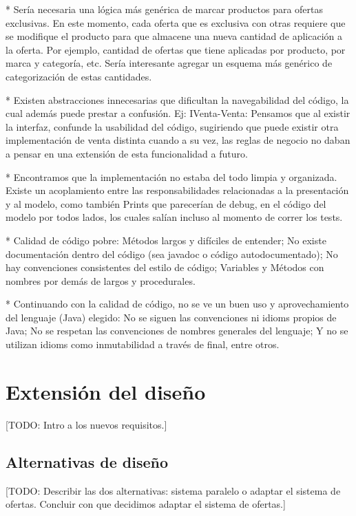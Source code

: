 \documentclass[a4paper,11pt]{article}
\begin{document}
  * Sería necesaria una lógica más genérica de marcar productos para ofertas
  exclusivas. En este momento, cada oferta que es exclusiva con otras
  requiere que se modifique el producto para que almacene una nueva cantidad de
  aplicación a la oferta. Por ejemplo, cantidad de ofertas que tiene aplicadas por producto,
  por marca y categoría, etc. Sería interesante agregar un esquema más genérico de 
  categorización de estas cantidades.

  * Existen abstracciones innecesarias que dificultan la navegabilidad del código, la cual 
  además puede prestar a confusión. Ej: IVenta-Venta: Pensamos que al existir la interfaz, 
  confunde la usabilidad del código, sugiriendo que puede existir otra implementación de venta
  distinta cuando a su vez, las reglas de negocio no daban a pensar en una extensión de esta 
  funcionalidad a futuro.
  
  * Encontramos que la implementación no estaba del todo limpia y organizada. Existe un
  acoplamiento entre las responsabilidades relacionadas a la presentación y al modelo,
  como también Prints que parecerían de debug, en el código del modelo por todos
  lados, los cuales salían incluso al momento de correr los tests.

  * Calidad de código pobre: Métodos largos y difíciles de entender; No existe documentación 
  dentro del código (sea javadoc o código autodocumentado); No hay convenciones consistentes
  del estilo de código; Variables y Métodos con nombres por demás de largos y procedurales.

  * Continuando con la calidad de código, no se ve un buen uso y aprovechamiento del lenguaje 
  (Java) elegido: No se siguen las convenciones ni idioms propios de Java; No se respetan 
  las convenciones de nombres generales del lenguaje; Y no se utilizan idioms como 
  inmutabilidad a través de final, entre otros.

\section{Extensión del diseño}

[TODO: Intro a los nuevos requisitos.]

\subsection{Alternativas de diseño}

[TODO: Describir las dos alternativas: sistema paralelo o adaptar el sistema de
ofertas. Concluir con que decidimos adaptar el sistema de ofertas.]
\end{document}
